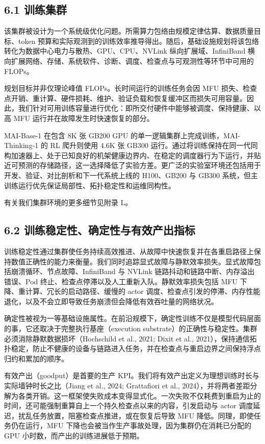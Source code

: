 \subsection{6.1 训练集群}\label{training-cluster}

该集群被设计为一个系统级优化问题。所需算力包络由规模定律估算、数据质量目标、token 预算和实际观测到的训练效率推导得出。随后，基础设施规划将该包络转化为数据中心电力与散热、GPU、CPU、NVLink 纵向扩展域、InfiniBand 横向扩展网络、存储、系统软件、诊断、调度、检查点与可观测性等环节中可用的 FLOPs。

规划目标并非仅理论峰值 FLOPs。长时间运行的训练任务会因 MFU 损失、检查点开销、重计算、硬件损耗、维护、验证负载和恢复缓冲区而损失可用容量。因此，我们针对可用训练容量进行优化：即所交付硬件中能够被调度、保持健康、以高 MFU 运行并在故障发生时快速恢复的部分。

MAI-Base-1 在包含 8K 张 GB200 GPU 的单一逻辑集群上完成训练，MAI-Thinking-1 的 RL 爬升则使用 4.6K 张 GB300 运行。通过将训练保持在同一代同构加速器上、处于已知良好的机架健康边界内、在稳定的调度器行为下运行，并贴近可预测的存储路径，这一选择降低了实验方差。更广泛的实验室环境还包括用于开发、验证、对比剖析和下一代系统上线的 H100、GB200 与 GB300 系统，但主训练运行优先保证局部性、拓扑稳定性和运维同构性。

有关我们集群环境的更多细节见附录 L。

\subsection{6.2 训练稳定性、确定性与有效产出指标}\label{training-stability-determinism-and-goodput-metrics}

训练稳定性通过集群使任务持续高效推进、从故障中快速恢复并在各重启路径上保持数值正确性的能力来衡量。我们同时追踪显式故障与静默效率损失。显式故障包括崩溃循环、节点故障、InfiniBand 与 NVLink 链路抖动和链路中断、内存溢出错误、Pod 终止、检查点停滞以及人工重新入队。静默效率损失包括 MFU 下降、重计算、冗长的启动路径、缓慢的 actor 调度、检查点引发的停滞、内存性能退化，以及不会立即导致任务崩溃但会降低有效吞吐量的网络状况。

确定性被视为一等基础设施属性。在前沿规模下，确定性训练不仅是模型代码层面的事，它还取决于完整执行基座（execution substrate）的正确性与稳定性。集群必须消除静默数据损坏（Hochschild et al., 2021; Dixit et al., 2021），保持通信拓扑稳定，防止不健康的设备与链路进入任务，并在检查点与重启边界之间保持浮点归约和累加的顺序。

有效产出（goodput）是首要的生产 KPI。我们将有效产出定义为理想训练时长与实际墙钟时长之比（Jiang et al., 2024; Grattafiori et al., 2024），并将两者差距分解为各类开销。这一框架使失败成本变得显式化。一次失败不仅耗费到重启为止的时间，还可能强制重算自上一个持久检查点以来的内容，引发启动与 actor 调度延迟，扰乱任务放置，阻塞检查点推进，或在恢复后导致 MFU 降低。同理，即使任务仍在运行，MFU 下降也会被当作生产事故处理，因为集群仍在消耗已分配的 GPU 小时数，而产出的训练进展低于预期。

